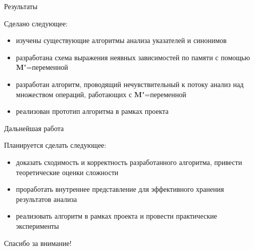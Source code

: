 \documentclass[usenames,dvipsnames,pdftex,unicode,hidelinks]{beamer}
\newcommand{\M}{\ensuremath{\mathbf{M}}}
\begin{document}
\begin{frame}{Результаты}

  Сделано следующее:
  \begin{itemize}
    \item изучены существующие алгоритмы анализа указателей и синонимов
    \item разработана схема выражения неявных зависимостей по памяти с помощью
          \M"=переменной
    \item разработан алгоритм, проводящий нечувствительный к потоку анализ над
          множеством операций, работающих с \M"=переменной
    \item реализован прототип алгоритма в рамках проекта 
  \end{itemize}

\end{frame}

\begin{frame}{Дальнейшая работа}

  Планируется сделать следующее:
  \begin{itemize}
    \item доказать сходимость и корректность разработанного алгоритма, привести
          теоретические оценки сложности
    \item проработать внутреннее представление для эффективного хранения
          результатов анализа
    \item реализовать алгоритм в рамках проекта  и провести
          практические эксперименты
  \end{itemize}

\end{frame}

\begin{frame}

  \centerline{\huge Спасибо за внимание!}

\end{frame}
\end{document}
